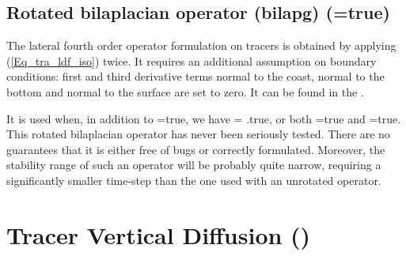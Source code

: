 \documentclass[NEMO_book]{subfiles}
\begin{document}
\subsection   [Rotated bilaplacian operator (bilapg) (\np{ln\_traldf\_bilap})]
			{Rotated bilaplacian operator (bilapg) (=true)}
\label{TRA_ldf_bilapg}

The lateral fourth order operator formulation on tracers is obtained by 
applying (\ref{Eq_tra_ldf_iso}) twice. It requires an additional assumption 
on boundary conditions: first and third derivative terms normal to the 
coast, normal to the bottom and normal to the surface are set to zero. It can be found in the
.

It is used when, in addition to =true, we have 
= .true, or both =true and =true. 
This rotated bilaplacian operator has never been seriously 
tested. There are no guarantees that it is either free of bugs or correctly formulated. 
Moreover, the stability range of such an operator will be probably quite 
narrow, requiring a significantly smaller time-step than the one used with an
unrotated operator.

\section  [Tracer Vertical Diffusion (\textit{trazdf})]
		{Tracer Vertical Diffusion ()}
\label{TRA_zdf}
\end{document}
